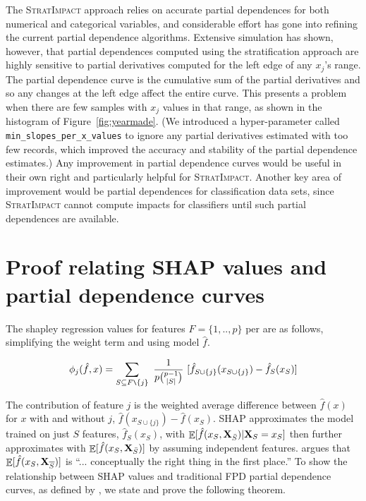 \documentclass[11pt]{article}
\newcommand{\figref}[1]{Figure~\ref{#1}}
\newcommand{\todo}[1]{{{\small\color{red}{[#1]}}}}
\DeclareMathOperator{\Ex}{\mathbb{E}}
\newcommand{\simp}{\fontfamily{cmr}\textsc{\small StratImpact}}
\begin{document}
The \simp{} approach relies on accurate partial dependences for both numerical and categorical variables, and considerable effort has gone into refining the current partial dependence algorithms. Extensive simulation has shown, however, that partial dependences computed using the stratification approach are highly sensitive to partial derivatives computed for the left edge of any $x_j$'s range. The partial dependence curve is the cumulative sum of the partial derivatives and so any changes at the left edge affect the entire curve.  This presents a problem when there are few samples with $x_j$ values in that range, as shown in the histogram of \figref{fig:yearmade}. (We introduced a hyper-parameter called {\tt\small min\_slopes\_per\_x\_values} to ignore any partial derivatives estimated with too few records, which improved the accuracy and stability of the partial dependence estimates.)  Any improvement in partial dependence curves would be useful in their own right and particularly helpful for \simp.    Another key area of improvement would be partial dependences for classification data sets, since \simp{} cannot compute impacts for classifiers until such partial dependences are available.


\appendix

\section{Proof relating SHAP values and partial dependence curves}

The shapley regression values for features $F=\{1,..,p\}$ per \cite{shap} are as follows, simplifying the weight term and using model $\hat{f}$.

\begin{equation}\label{shapregr}
\phi_j(\hat{f},x) = \sum_{S \subseteq F \texttt{\char`\\} \{j\}}\
\frac{1}{p{{p-1}\choose{|S|}}}\
 [ \hat{f}_{S \cup \{j\}}(x_{S \cup \{j\}}) - \hat{f}_S(x_S) ]
\end{equation}

The contribution of feature $j$ is the weighted average difference between $\hat{f}(x)$ for $x$ with and without $j$, $\hat{f}(x_{S \cup \{j\}}) - \hat{f}(x_S)$. SHAP approximates the model trained on just $S$ features, $\hat{f}_S(x_S)$, with $\Ex[\hat{f}(x_{S},{\bf X}_{\bar{S}}) | {\bf X}_S = x_S]$ then further approximates with $\Ex[\hat{f}(x_{S},{\bf X}_{\bar{S}})]$ by assuming independent features. \cite{janzing2019feature} argues that $\Ex[\hat{f}(x_{S},{\bf X}_{\overline{S}})]$ is ``... conceptually the right thing in the first place.'' \todo{that stuff is repeat} To show the relationship between SHAP values and traditional FPD partial dependence curves, as defined by \cite{PDP}, we state and prove the following theorem. \todo{ I moved the proof}
\end{document}
